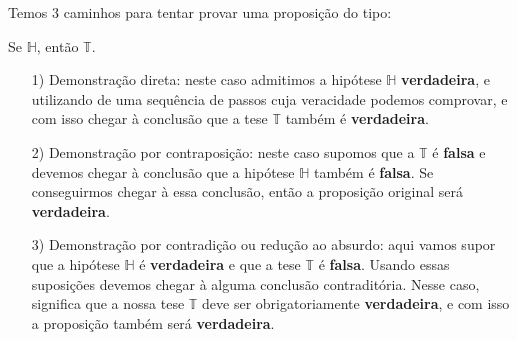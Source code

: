 \documentclass{beamer}
\begin{document}
    \begin{frame}
        Temos 3 caminhos para tentar provar uma proposi\c{c}\~ao do tipo:
        \begin{center}
            Se $\mathbb{H}$, ent\~ao $\mathbb{T}$.\pause
        \end{center}

        \begin{itemize}
            \item[1)] Demonstra\c{c}\~ao direta: \pause neste caso admitimos a hip\'otese $\mathbb{H}$ \textbf{verdadeira}, e utilizando de uma
                sequ\^encia de passos cuja veracidade podemos comprovar, e com isso chegar \`a conclus\~ao que a tese $\mathbb{T}$ tamb\'em \'e
                \textbf{verdadeira}.\pause
            \item[2)] Demonstra\c{c}\~ao por contraposi\c{c}\~ao: \pause neste caso supomos que a $\mathbb{T}$ \'e \textbf{falsa} e devemos
                chegar \`a conclus\~ao que a hip\'otese $\mathbb{H}$ tamb\'em \'e \textbf{falsa}. Se conseguirmos chegar \`a essa
                conclus\~ao, ent\~ao a proposi\c{c}\~ao original ser\'a \textbf{verdadeira}.\pause
            \item[3)] Demonstra\c{c}\~ao por contradi\c{c}\~ao ou redu\c{c}\~ao ao absurdo: \pause aqui vamos supor que a hip\'otese
                $\mathbb{H}$ \'e \textbf{verdadeira} \pause e que a tese $\mathbb{T}$ \'e \textbf{falsa}. Usando essas suposi\c{c}\~oes
                devemos chegar \`a alguma conclus\~ao contradit\'oria. \pause Nesse caso, significa que a nossa tese $\mathbb{T}$ deve ser
                obrigatoriamente \textbf{verdadeira}, e com isso a proposi\c{c}\~ao tamb\'em ser\'a \textbf{verdadeira}.\pause
        \end{itemize}
    \end{frame}
\end{document}
